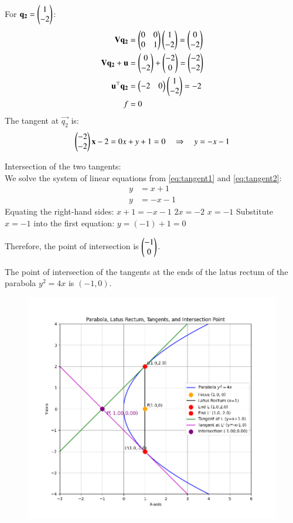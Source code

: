 \documentclass[journal]{IEEEtran}
\begin{document}
    For $\mathbf{q_2} = \begin{pmatrix}1 \\ -2\end{pmatrix}$:
    \begin{align}
    \mathbf{V}\mathbf{q_2} &= \begin{pmatrix}0 & 0 \\ 0 & 1\end{pmatrix}\begin{pmatrix}1 \\ -2\end{pmatrix} = \begin{pmatrix}0 \\ -2\end{pmatrix} \\
    \mathbf{V}\mathbf{q_2} + \mathbf{u} &= \begin{pmatrix}0 \\ -2\end{pmatrix} + \begin{pmatrix}-2 \\ 0\end{pmatrix} = \begin{pmatrix}-2 \\ -2\end{pmatrix} \\
    \mathbf{u}^{\top}\mathbf{q_2} &= \begin{pmatrix}-2 & 0\end{pmatrix}\begin{pmatrix}1 \\ -2\end{pmatrix} = -2 \\
    f &= 0
    \end{align}
    The tangent at $\vec{q_2}$ is:
    \begin{align}
    \begin{pmatrix}-2 \\ -2\end{pmatrix}\mathbf{x} - 2 = 0
     x + y + 1 = 0 \quad \Rightarrow \quad y = -x-1\label{eq:tangent2}
    \end{align}
      
      
    Intersection of the two tangents:\\
    We solve the system of linear equations from \ref{eq:tangent1} and \ref{eq:tangent2}:
    \begin{align}
    y &= x+1 \\
    y &= -x-1
    \end{align}
    Equating the right-hand sides:
    $x+1 = -x-1$
    $2x = -2$
    $x = -1$
    Substitute $x=-1$ into the first equation:
    $y = (-1) + 1 = 0$

    Therefore, the point of intersection is $\begin{pmatrix}-1 \\ 0\end{pmatrix}$.

The point of intersection of the tangents at the ends of the latus rectum of the parabola $y^2 = 4x$ is $\boxed{(-1, 0)}$.

\begin{figure}[H]
\centering
\includegraphics[width=0.7\columnwidth]{figs/mat181.png}
\caption{}
\label{fig:1}
\end{figure}
\end{document}
